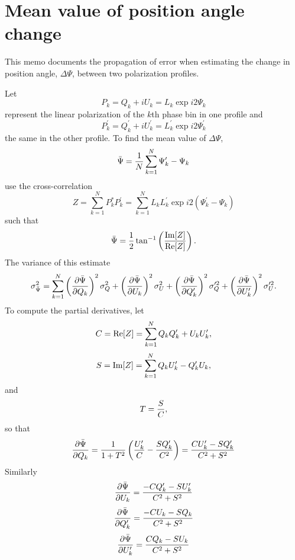 \documentclass[12pt]{article}
\newcommand{\real}{{\rm Re}}
\newcommand{\imag}{{\rm Im}}
\begin{document}
\section{Mean value of position angle change}

This memo documents the propagation of error when estimating the
change in position angle, $\Delta\Psi$, between two polarization
profiles.

Let
\begin{equation}
P_k = Q_k + i U_k = L_k \exp i2\Psi_k
\end{equation}
represent the linear polarization of the $k$th phase bin in one profile and
\begin{equation}
P^\prime_k = Q^\prime_k + i U^\prime_k = L^\prime_k \exp i2\Psi^\prime_k
\end{equation}
the same in the other profile.  To find the mean value of $\Delta\Psi$,
\begin{equation}
\bar\Psi = {1\over N}\sum_{k=1}^N \Psi^\prime_k - \Psi_k
\end{equation}
use the cross-correlation
\begin{equation}
Z = \sum_{k=1}^N P^*_k P^\prime_k 
  = \sum_{k=1}^N L_k L^\prime_k \exp i2(\Psi^\prime_k - \Psi_k)
\end{equation}
such that
\begin{equation}
\bar\Psi
={1\over2}\tan^{-1}\left({\imag[Z]\over\real[Z]}\right).
\end{equation}
The variance of this estimate
\begin{equation}
\sigma_{\bar\Psi}^2 = \sum_{k=1}^N 
\left({\partial\bar\Psi\over\partial Q_k}\right)^2 \sigma_Q^2 +
\left({\partial\bar\Psi\over\partial U_k}\right)^2 \sigma_U^2 +
\left({\partial\bar\Psi\over\partial Q^\prime_k}\right)^2 \sigma_Q^{\prime2} +
\left({\partial\bar\Psi\over\partial U^\prime_k}\right)^2 \sigma_U^{\prime2}.
\end{equation}
To compute the partial derivatives, let
\begin{equation}
C = \real[Z] = \sum_{k=1}^N Q_kQ^\prime_k + U_kU^\prime_k,
\end{equation}
\begin{equation}
S = \imag[Z] = \sum_{k=1}^N Q_kU^\prime_k - Q^\prime_kU_k,
\end{equation}
and
\begin{equation}
T = {S\over C},
\end{equation}
so that
\begin{equation}
{\partial\bar\Psi\over\partial Q_k} 
= {1\over1+T^2} \left( {U^\prime_k \over C} - {S Q^\prime_k\over C^2} \right)
= { C U^\prime_k - S Q^\prime_k \over C^2 + S^2 }
\end{equation}
Similarly
\begin{equation}
{\partial\bar\Psi\over\partial U_k} 
= { -C Q^\prime_k - S U^\prime_k \over C^2 + S^2 }
\end{equation}
\begin{equation}
{\partial\bar\Psi\over\partial Q^\prime_k} 
= { -C U_k - S Q_k \over C^2 + S^2 }
\end{equation}
\begin{equation}
{\partial\bar\Psi\over\partial U^\prime_k} 
= { C Q_k - S U_k \over C^2 + S^2 }
\end{equation}
\end{document}
